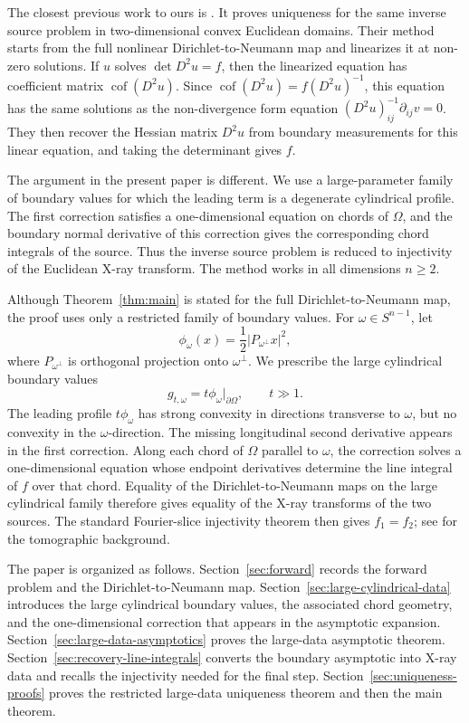 \documentclass[11pt]{article}
\numberwithin{equation}{section}
\newcommand{\Om}{\Omega}
\begin{document}
The closest previous work to ours is \cite{LiimatainenLin2025}.  It proves uniqueness for the same inverse source problem in two-dimensional convex Euclidean domains.  Their method starts from the full nonlinear Dirichlet-to-Neumann map and linearizes it at non-zero solutions.  If \(u\) solves \(\det D^2u=f\), then the linearized equation has coefficient matrix \(\operatorname{cof}(D^2u)\).  Since \(\operatorname{cof}(D^2u)=f(D^2u)^{-1}\), this equation has the same solutions as the non-divergence form equation \((D^2u)^{-1}_{ij}\partial_{ij}v=0\).  They then  recover the Hessian matrix \(D^2u\) from boundary measurements for this linear equation, and taking the determinant gives $f$.  

The  argument in the present paper is different. We use a large-parameter family of boundary values for which the leading term is a degenerate cylindrical profile.  The first correction satisfies a one-dimensional equation on chords of \(\Omega\), and the boundary normal derivative of this correction gives the corresponding chord integrals of the source.  Thus the inverse source problem is reduced to injectivity of the Euclidean X-ray transform. The method works in all dimensions \(n\ge2\).

Although Theorem~\ref{thm:main} is stated for the full Dirichlet-to-Neumann map, the proof uses only a restricted family of boundary values.  For \(\omega\in S^{n-1}\), let
\[
    \phi_\omega(x)=\frac12|P_{\omega^\perp}x|^2,
\]
where \(P_{\omega^\perp}\) is orthogonal projection onto \(\omega^\perp\).  We prescribe the large cylindrical boundary values
\[
    g_{t,\omega}=t\phi_\omega|_{\partial\Om},
    \qquad t\gg1.
\]
The leading profile \(t\phi_\omega\) has strong convexity in directions transverse to \(\omega\), but no convexity in the \(\omega\)-direction.  The missing longitudinal second derivative appears in the first correction.  Along each chord of \(\Omega\) parallel to \(\omega\), the correction solves a one-dimensional equation whose endpoint derivatives determine the line integral of \(f\) over that chord.  Equality of the Dirichlet-to-Neumann maps on the large cylindrical family therefore gives equality of the X-ray transforms of the two sources.  The standard Fourier-slice injectivity theorem then gives \(f_1=f_2\); see \cite{Natterer2001} for the tomographic background.

The paper is organized as follows.  Section~\ref{sec:forward} records the forward problem and the Dirichlet-to-Neumann map.  Section~\ref{sec:large-cylindrical-data} introduces the large cylindrical boundary values, the associated chord geometry, and the one-dimensional correction that appears in the asymptotic expansion.  Section~\ref{sec:large-data-asymptotics} proves the large-data asymptotic theorem.  Section~\ref{sec:recovery-line-integrals} converts the boundary asymptotic into X-ray data and recalls the injectivity needed for the final step.  Section~\ref{sec:uniqueness-proofs} proves the restricted large-data uniqueness theorem and then the main theorem.
\end{document}
